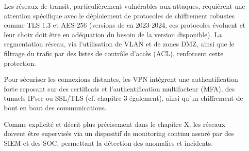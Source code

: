 Les réseaux de transit, particulièrement vulnérables aux attaques, requièrent une attention spécifique avec le déploiement de protocoles de chiffrement robustes comme TLS 1.3 et AES-256 (versions de en 2023-2024, ces protocoles évoluent et leur choix doit être en adéquation du besoin de la version disponible). La segmentation réseau, via l'utilisation de VLAN et de zones DMZ, ainsi que le filtrage du trafic par des listes de contrôle d'accès (ACL), renforcent cette protection.

Pour sécuriser les connexions distantes, les VPN intègrent une authentification forte reposant sur des certificats et l'authentification multifacteur (MFA), des tunnels IPsec ou SSL/TLS (cf. chapitre 3 également), ainsi qu'un chiffrement de bout en bout des communications.

Comme explicité et décrit plus précisement dans le chapitre X, les réseaux doivent être supervisés via un dispositif de monitoring continu assuré par des SIEM et des SOC, permettant la détection des anomalies et incidents.



